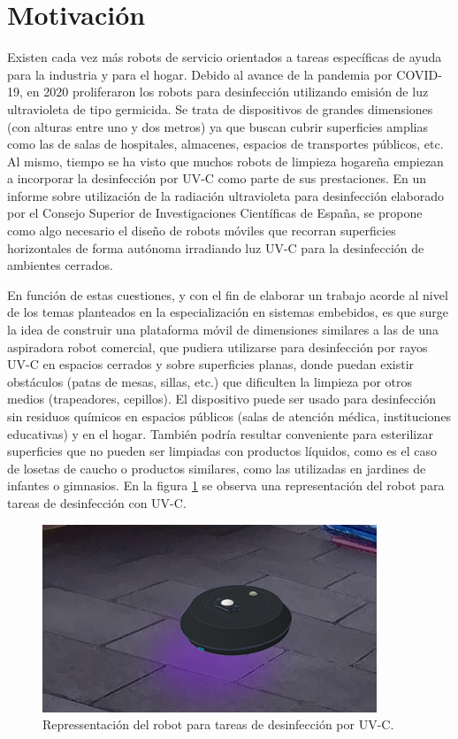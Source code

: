 
\section{Motivación}

Existen cada vez más robots de servicio orientados a tareas específicas de ayuda para la industria y para el hogar. 
Debido al avance de la pandemia por COVID-19, en 2020 proliferaron los robots  para desinfección utilizando emisión de luz ultravioleta de tipo germicida. Se trata de dispositivos de grandes dimensiones (con alturas entre uno y dos metros) ya que buscan cubrir superficies amplias como las de salas de hospitales, almacenes, espacios de transportes públicos, etc. Al mismo, tiempo se ha visto que muchos robots de limpieza hogareña empiezan a incorporar la desinfección por UV-C como parte de sus prestaciones. 
En un informe sobre utilización de la radiación ultravioleta para desinfección \citep{CSIC} elaborado por el Consejo Superior de Investigaciones Científicas de España, se propone como algo necesario el diseño de robots móviles que recorran superficies horizontales de forma autónoma irradiando luz UV-C para la desinfección de ambientes cerrados.

En función de estas cuestiones, y con el fin de elaborar un trabajo acorde al nivel de los temas planteados en la especialización en sistemas embebidos, es que surge la idea de construir una plataforma móvil de dimensiones similares a las de una aspiradora robot comercial, que pudiera utilizarse para desinfección por rayos UV-C en espacios cerrados y sobre superficies planas, donde puedan existir obstáculos (patas de mesas, sillas, etc.) que dificulten la limpieza por otros medios (trapeadores, cepillos). El dispositivo puede ser usado para desinfección sin residuos químicos en espacios públicos (salas de atención médica, instituciones educativas) y en el hogar. También podría resultar conveniente para esterilizar superficies que no pueden ser limpiadas con productos líquidos, como es el caso de losetas de caucho o productos similares, como las utilizadas en jardines de infantes o gimnasios. En la figura \ref{fig:ruvot} se observa una representación del robot para tareas de desinfección con UV-C.


\begin{figure}[h]
	\centering
	\includegraphics[width=10cm]{./Figures/rUVot14.png}
	\caption{Repressentación del robot para tareas de desinfección por UV-C.}
	\label{fig:ruvot}
\end{figure}


